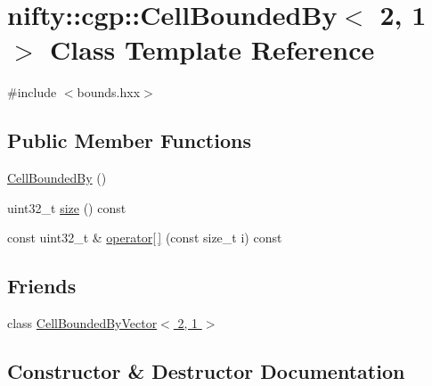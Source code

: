 \hypertarget{classnifty_1_1cgp_1_1CellBoundedBy_3_012_00_011_01_4}{}\section{nifty\+:\+:cgp\+:\+:Cell\+Bounded\+By$<$ 2, 1 $>$ Class Template Reference}
\label{classnifty_1_1cgp_1_1CellBoundedBy_3_012_00_011_01_4}


{\ttfamily \#include $<$bounds.\+hxx$>$}

\subsection*{Public Member Functions}
\begin{DoxyCompactItemize}
\item 
\hyperlink{classnifty_1_1cgp_1_1CellBoundedBy_3_012_00_011_01_4_ad22d7f083d1f1ac4b379d19281b63986}{Cell\+Bounded\+By} ()
\item 
uint32\+\_\+t \hyperlink{classnifty_1_1cgp_1_1CellBoundedBy_3_012_00_011_01_4_a11cba86b898c087a7b8a8c8d60e043d4}{size} () const 
\item 
const uint32\+\_\+t \& \hyperlink{classnifty_1_1cgp_1_1CellBoundedBy_3_012_00_011_01_4_a99d19433fb86ffe10bc37e7e967c2c68}{operator\mbox{[}$\,$\mbox{]}} (const size\+\_\+t i) const 
\end{DoxyCompactItemize}
\subsection*{Friends}
\begin{DoxyCompactItemize}
\item 
class \hyperlink{classnifty_1_1cgp_1_1CellBoundedBy_3_012_00_011_01_4_abdb37afb9b659d234727be05e2560e42}{Cell\+Bounded\+By\+Vector$<$ 2, 1 $>$}
\end{DoxyCompactItemize}


\subsection{Constructor \& Destructor Documentation}
\hypertarget{classnifty_1_1cgp_1_1CellBoundedBy_3_012_00_011_01_4_ad22d7f083d1f1ac4b379d19281b63986}{}
